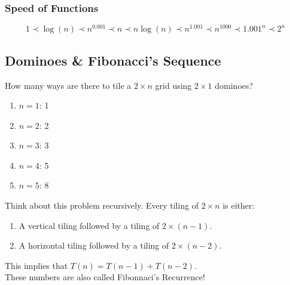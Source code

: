 \documentclass{article}
\begin{document}
\subsubsection{Speed of Functions}
$$1 \prec \log(n) \prec n^{0.001} \prec n \prec n \log(n) \prec n^{1.001} \prec n^{1000} \prec 1.001^n \prec 2^n$$

\subsection{Dominoes & Fibonacci's Sequence}
How many ways are there to tile a $2 \times n$ grid using $2 \times 1$ dominoes?
\begin{enumerate}
    \item $n = 1$: 1
    \item $n = 2$: 2
    \item $n = 3$: 3
    \item $n = 4$: 5
    \item $n = 5$: 8
\end{enumerate}
Think about this problem recursively. Every tiling of $2 \times n$ is either:
\begin{enumerate}
    \item A vertical tiling followed by a tiling of $2 \times (n - 1)$.
    \item A horizontal tiling followed by a tiling of $2 \times (n -2)$.
\end{enumerate}
This implies that $T(n) = T(n - 1) + T(n - 2)$.\\
These numbers are also called Fibonnaci's Recurrence!
\end{document}
